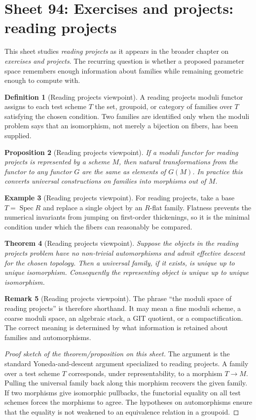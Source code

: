 \documentclass[11pt]{amsart}
\newtheorem{theorem}{Theorem}[section]
\newtheorem{proposition}[theorem]{Proposition}
\theoremstyle{definition}
\newtheorem{definition}[theorem]{Definition}
\newtheorem{example}[theorem]{Example}
\newtheorem{remark}[theorem]{Remark}
\newcommand{\Spec}{\operatorname{Spec}}
\begin{document}
\section{Sheet 94: Exercises and projects: reading projects}
This sheet studies \emph{reading projects} as it appears in the broader chapter on \emph{exercises and projects}.  The recurring question is whether a proposed parameter space remembers enough information about families while remaining geometric enough to compute with.
\begin{definition}[Reading projects viewpoint]
A reading projects moduli functor assigns to each test scheme $T$ the set, groupoid, or category of families over $T$ satisfying the chosen condition.  Two families are identified only when the moduli problem says that an isomorphism, not merely a bijection on fibers, has been supplied.
\end{definition}
\begin{proposition}[Reading projects viewpoint]
If a moduli functor for reading projects is represented by a scheme $M$, then natural transformations from the functor to any functor $G$ are the same as elements of $G(M)$.  In practice this converts universal constructions on families into morphisms out of $M$.
\end{proposition}
\begin{example}[Reading projects viewpoint]
For reading projects, take a base $T=\Spec R$ and replace a single object by an $R$-flat family.  Flatness prevents the numerical invariants from jumping on first-order thickenings, so it is the minimal condition under which the fibers can reasonably be compared.
\end{example}
\begin{theorem}[Reading projects viewpoint]
Suppose the objects in the reading projects problem have no non-trivial automorphisms and admit effective descent for the chosen topology.  Then a universal family, if it exists, is unique up to unique isomorphism.  Consequently the representing object is unique up to unique isomorphism.
\end{theorem}
\begin{remark}[Reading projects viewpoint]
The phrase ``the moduli space of reading projects'' is therefore shorthand.  It may mean a fine moduli scheme, a coarse moduli space, an algebraic stack, a GIT quotient, or a compactification.  The correct meaning is determined by what information is retained about families and automorphisms.
\end{remark}
\begin{proof}[Proof sketch of the theorem/proposition on this sheet]
The argument is the standard Yoneda-and-descent argument specialized to reading projects.  A family over a test scheme $T$ corresponds, under representability, to a morphism $T\to M$.  Pulling the universal family back along this morphism recovers the given family.  If two morphisms give isomorphic pullbacks, the functorial equality on all test schemes forces the morphisms to agree.  The hypotheses on automorphisms ensure that the equality is not weakened to an equivalence relation in a groupoid.
\end{proof}
\end{document}
